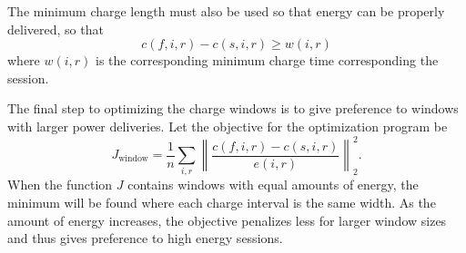 The minimum charge length must also be used so that energy can be properly delivered, so that
\begin{equation*}
	c(f,i,r) - c(s,i,r) \ge w(i,r)
\end{equation*}
where $w(i,r)$ is the corresponding minimum charge time corresponding the session.
\par The final step to optimizing the charge windows is to give preference to windows with larger power deliveries. Let the objective for the optimization program be 
\begin{equation}
	J_{\text{window}} = \frac{1}{n}\sum_{i,r} \left \lVert \frac{c(f,i,r) - c(s,i,r)}{e(i,r)} \right \rVert^2_2.
\end{equation}
When the function $J$ contains windows with equal amounts of energy, the minimum will be found where each charge interval is the same width. As the amount of energy increases, the objective penalizes less for larger window sizes and thus gives preference to high energy sessions.
